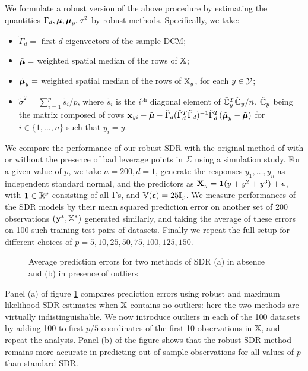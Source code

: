 We formulate a robust version of the above procedure by estimating the quantities $\Gamma_d, {\boldsymbol{\mu}}, {\boldsymbol{\mu}}_y, \sigma^2$ by robust methods. Specifically, we take:
%
\begin{itemize}
\item $\tilde \Gamma_d = $ first $d$ eigenvectors of the sample DCM;
%
\item $\tilde {{\boldsymbol{\mu}}} = $ weighted spatial median of the rows of ${\mathbb{X}}$;
%
\item $\tilde {{\boldsymbol{\mu}}}_y = $ weighted spatial median of the rows of ${\mathbb{X}}_y$, for each $y \in \mathcal{Y}$;
%
\item $\tilde\sigma^2 = \sum_{i=1}^p \tilde s_i/p$, where $\tilde s_i$ is the $i^\text{th}$ diagonal element of $\tilde {{\mathbb{C}}}_y^T \tilde {{\mathbb{C}}}_y/n$, $\tilde {{\mathbb{C}}}_y$ being the matrix composed of rows ${\bf{x}}_{yi} - \tilde {{\boldsymbol{\mu}}} - \tilde \Gamma_d (\tilde \Gamma_d^T \tilde \Gamma_d)^{-1} \tilde \Gamma_d^T (\tilde {{\boldsymbol{\mu}}}_y - \tilde {{\boldsymbol{\mu}}} )$ for $i \in \{ 1, \ldots, n \}$ such that $y_i = y$.
\end{itemize}
%
We compare the performance of our robust SDR with the original method of \cite{AdragniCook09} with or without the presence of bad leverage points in $\Sigma$ using a simulation study. For a given value of $p$, we take $n=200, d=1$, generate the responses $y_1, \ldots, y_n$ as independent standard normal, and the predictors as ${\mathbf{X}}_y = {\bf 1} (y + y^2 + y^3) + {\boldsymbol{\epsilon}}$, with ${\bf 1} \in {\mathbb{R}}^p$ consisting of all 1's, and ${\mathbb{V}}({\boldsymbol{\epsilon}}) = 25 {\mathbb{I}}_p$. We measure performances of the SDR models by their mean squared prediction error on another set of 200 observations $({\bf{y}}^*, {\mathbb{X}}^*)$ generated similarly, and taking the average of these errors on 100 such training-test pairs of datasets. Finally we repeat the full setup for different choices of $p = 5,10,25,50,75,100,125,150$.

\begin{figure}[t]
\begin{center}
\caption{Average prediction errors for two methods of SDR (a) in absence and (b) in presence of outliers}
\label{fig:SDRfig}
\end{center}
\end{figure}

Panel (a) of figure \ref{fig:SDRfig} compares prediction errors using robust and maximum likelihood SDR estimates when ${\mathbb{X}}$ contains no outliers: here the two methods are virtually indistinguishable. We now introduce outliers in each of the 100 datasets by adding 100 to first $p/5$ coordinates of the first 10 observations in ${\mathbb{X}}$, and repeat the analysis. Panel (b) of the figure shows that the robust SDR method remains more accurate in predicting out of sample observations for all values of $p$ than standard SDR.

